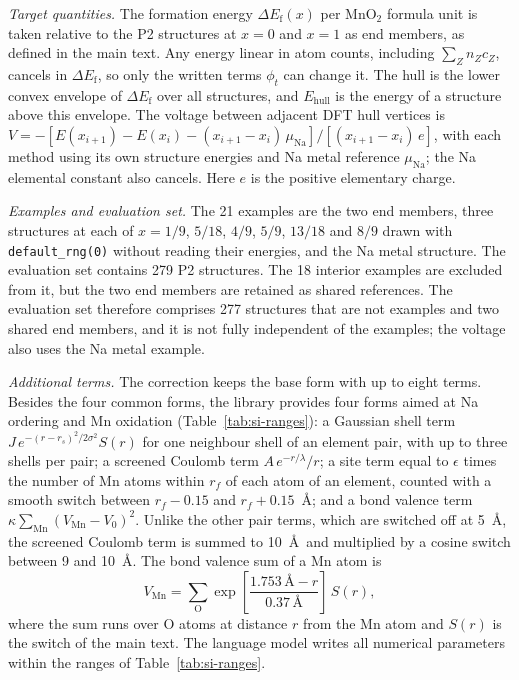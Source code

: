 \textit{Target quantities.} The formation energy $\Delta E_\mathrm{f}(x)$ per MnO$_2$ formula unit is taken relative to the P2 structures at $x=0$ and $x=1$ as end members, as defined in the main text. Any energy linear in atom counts, including $\sum_Z n_Z c_Z$, cancels in $\Delta E_\mathrm{f}$, so only the written terms $\phi_t$ can change it. The hull is the lower convex envelope of $\Delta E_\mathrm{f}$ over all structures, and $E_{\mathrm{hull}}$ is the energy of a structure above this envelope. The voltage between adjacent DFT hull vertices is $V=-[E(x_{i+1})-E(x_i)-(x_{i+1}-x_i)\,\mu_{\mathrm{Na}}]/[(x_{i+1}-x_i)\,e]$, with each method using its own structure energies and Na metal reference $\mu_{\mathrm{Na}}$; the Na elemental constant also cancels. Here $e$ is the positive elementary charge.

\textit{Examples and evaluation set.} The 21 examples are the two end members, three structures at each of $x=1/9$, $5/18$, $4/9$, $5/9$, $13/18$ and $8/9$ drawn with \texttt{default\_rng(0)} without reading their energies, and the Na metal structure. The evaluation set contains 279 P2 structures. The 18 interior examples are excluded from it, but the two end members are retained as shared references. The evaluation set therefore comprises 277 structures that are not examples and two shared end members, and it is not fully independent of the examples; the voltage also uses the Na metal example.

\textit{Additional terms.} The correction keeps the base form with up to eight terms. Besides the four common forms, the library provides four forms aimed at Na ordering and Mn oxidation (Table~\ref{tab:si-ranges}): a Gaussian shell term $J\,e^{-(r-r_s)^2/2\sigma^2}S(r)$ for one neighbour shell of an element pair, with up to three shells per pair; a screened Coulomb term $A\,e^{-r/\lambda}/r$; a site term equal to $\epsilon$ times the number of Mn atoms within $r_f$ of each atom of an element, counted with a smooth switch between $r_f-0.15$ and $r_f+0.15$~\AA; and a bond valence term $\kappa\sum_{\mathrm{Mn}}(V_{\mathrm{Mn}}-V_0)^2$. Unlike the other pair terms, which are switched off at 5~\AA, the screened Coulomb term is summed to 10~\AA\ and multiplied by a cosine switch between 9 and 10~\AA. The bond valence sum of a Mn atom is
\begin{equation}
V_{\mathrm{Mn}}=\sum_{\mathrm{O}}\exp\!\left[\frac{1.753\,\text{\AA}-r}{0.37\,\text{\AA}}\right]\,S(r),
\label{eq:si-vmn}
\end{equation}
where the sum runs over O atoms at distance $r$ from the Mn atom and $S(r)$ is the switch of the main text. The language model writes all numerical parameters within the ranges of Table~\ref{tab:si-ranges}.

